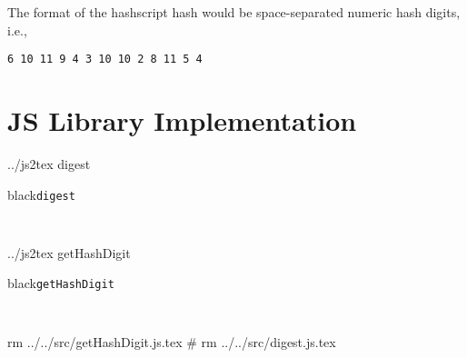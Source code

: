 \documentclass[letterpaper,twocolumn]{article}%
\begin{document}
The format of the hashscript hash would be space-separated
numeric hash digits, i.e., \begin{verbatim}6 10 11 9 4 3 10 10 2 8 11 5 4\end{verbatim}

\section{JS Library Implementation}


\bash[stdout]
../js2tex digest
\END
\begin{codebox}[label={myautocounter}]{black}{\texttt{\scriptsize digest}}

\begin{singlespace}
   
{\fontsize{5}{12} \selectfont %
\texttt{
  }}\end{singlespace}\end{codebox}%




\bash[stdout]
../js2tex getHashDigit
\END
\begin{codebox}[label={myautocounter}]{black}{\texttt{\scriptsize getHashDigit}}

\begin{singlespace}
  
{\fontsize{5}{12} \selectfont %
\texttt{
  }}\end{singlespace}\end{codebox}%


\bash[stdout]
rm ../../src/getHashDigit.js.tex
# rm ../../src/digest.js.tex
\END
\end{document}
